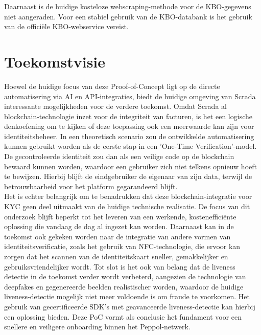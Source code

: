 Daarnaast is de huidige kosteloze webscraping-methode voor de KBO-\-gegevens niet aangeraden. Voor een stabiel gebruik van de KBO-databank is het gebruik van de officiële KBO-webservice vereist.

\section{Toekomstvisie}
Hoewel de huidige focus van deze Proof-of-Concept ligt op de directe automatisering via AI en API-integraties, 
biedt de huidige omgeving van Scrada interessante mogelijkheden voor de verdere toekomst. Omdat Scrada al blockchain-technologie inzet voor de integriteit van facturen, 
is het een logische denkoefening om te kijken of deze toepassing ook een meerwaarde kan zijn voor identiteitsbeheer.
In een theoretisch scenario zou de ontwikkelde automatisering kunnen gebruikt worden als de eerste stap in een 'One-Time Verification'-model. 
De gecontroleerde identiteit zou dan als een veilige code op de blockchain bewaard kunnen worden, waardoor een gebruiker zich niet telkens opnieuw hoeft te bewijzen. Hierbij blijft de eindgebruiker de eigenaar van zijn data, terwijl de betrouwbaarheid voor het platform gegarandeerd blijft.
\\ Het is echter belangrijk om te benadrukken dat deze blockchain-integratie voor KYC geen deel uitmaakt van de huidige technische realisatie. De focus van dit onderzoek blijft beperkt tot het leveren van een werkende, kostenefficiënte oplossing die vandaag de dag al ingezet kan worden. 
Daarnaast kan in de toekomst ook gekeken worden naar de integratie van andere vormen van identiteitsverificatie, zoals het gebruik van NFC-technologie, die ervoor kan zorgen dat het scannen van de identiteitskaart sneller, gemakkelijker en gebruiksvriendelijker wordt.
Tot slot is het ook van belang dat de liveness detectie in de toekomst verder wordt verbeterd, aangezien de technologie van deepfakes en gegenereerde beelden realistischer worden, waardoor de huidige liveness-detectie mogelijk niet meer voldoende is om fraude te voorkomen. Het gebruik van gecertificeerde SDK's met geavanceerde liveness-detectie kan hierbij een oplossing bieden.
Deze PoC vormt als conclusie het fundament voor een snellere en veiligere onboarding binnen het Peppol-netwerk.